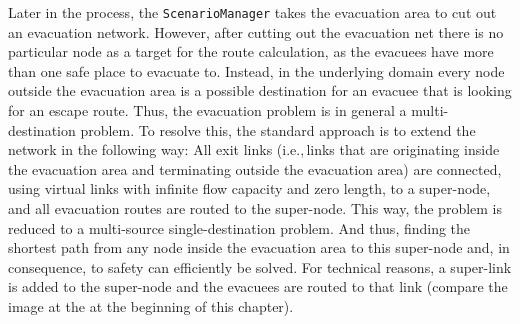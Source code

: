 Later in the process, the \lstinline|ScenarioManager| takes the evacuation area to cut out an evacuation network. However, after cutting out the evacuation net there is no particular node as a target for the route calculation, as the evacuees have more than one safe place to evacuate to. Instead, in the underlying domain every node outside the evacuation area is a possible destination for an evacuee that is looking for an escape route. Thus, the evacuation problem is in general a multi-destination problem. To resolve this, the standard approach \citep[e.g.,][]{FordFulkerson1962FlowsInNetworks,LuGeorgeEtAl2005CapacityConstrainedRouting} is to extend the network in the following way: All exit links (i.e.,\,links that are originating inside the evacuation area and terminating outside the evacuation area) are connected, using virtual links with infinite flow capacity and zero length, to a super-node, and all evacuation routes are routed to the super-node. This way, the problem is reduced to a multi-source single-destination problem. And thus, finding the shortest path from any node inside the evacuation area to this super-node and, in consequence, to safety can efficiently be solved. For technical reasons, a super-link is added to the super-node and the evacuees are routed to that link (compare the image at the at the beginning of this chapter).

